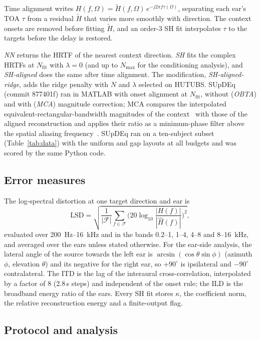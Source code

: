 \documentclass[11pt,a4paper]{article}
\newcommand{\us}{\,\textmu s}
\begin{document}
Time alignment writes $H(f,\Omega)=\tilde H(f,\Omega)\,e^{-j2\pi f\tau(\Omega)}$, separating each ear's TOA $\tau$ from a residual $\tilde H$ that varies more smoothly with direction. The context onsets are removed before fitting $\tilde H$, and an order-3 SH fit interpolates $\tau$ to the targets before the delay is restored.

\emph{NN} returns the HRTF of the nearest context direction. \emph{SH} fits the complex HRTFs at $N_{\mathrm{fit}}$ with $\lambda=0$ (and up to $N_{\max}$ for the conditioning analysis), and \emph{SH-aligned} does the same after time alignment. The modification, \emph{SH-aligned-ridge}, adds the ridge penalty with $N$ and $\lambda$ selected on HUTUBS. SUpDEq~\cite{supdeq} (commit 877401f) ran in MATLAB with onset alignment at $N_{\mathrm{fit}}$, without (\emph{OBTA}) and with (\emph{MCA}) magnitude correction; MCA compares the interpolated equivalent-rectangular-bandwidth magnitudes of the context~\cite{slaney1998} with those of the aligned reconstruction and applies their ratio as a minimum-phase filter above the spatial aliasing frequency~\cite{arend2023}. SUpDEq ran on a ten-subject subset (Table~\ref{tab:data}) with the uniform and gap layouts at all budgets and was scored by the same Python code.

\subsection{Error measures}

The log-spectral distortion at one target direction and ear is
\begin{equation}
\mathrm{LSD}=\sqrt{\frac{1}{|\mathcal F|}\sum_{f\in\mathcal F}\Big(20\log_{10}\frac{|H(f)|}{|\hat H(f)|}\Big)^2},
\end{equation}
evaluated over 200~Hz--16~kHz and in the bands 0.2--1, 1--4, 4--8 and 8--16~kHz, and averaged over the ears unless stated otherwise. For the ear-side analysis, the lateral angle of the source towards the left ear is $\arcsin(\cos\theta\sin\phi)$ (azimuth $\phi$, elevation $\theta$) and its negative for the right ear, so $+90^\circ$ is ipsilateral and $-90^\circ$ contralateral. The ITD is the lag of the interaural cross-correlation, interpolated by a factor of 8 (2.8\us{} steps) and independent of the onset rule; the ILD is the broadband energy ratio of the ears. Every SH fit stores $\kappa$, the coefficient norm, the relative reconstruction energy and a finite-output flag.

\subsection{Protocol and analysis}
\label{sec:protocol}
\end{document}
